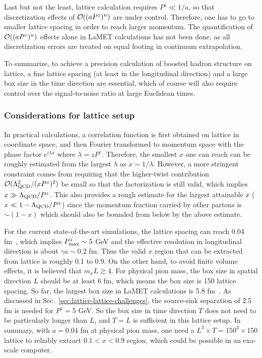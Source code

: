 \documentclass[aps,rmp,reprint,amsmath,amssymb,graphicx,longbibliography]{revtex4-1} %
\begin{document}
Last but not the least, lattice calculation requires $P^z\ll 1/a$, so that discretization effects of ${\cal O}((aP^z)^n)$ are under control. Therefore, one has to go to smaller lattice spacing in order to reach larger momentum. The quantification of ${\cal O}((aP^z)^n)$ effects alone in LaMET calculations has not been done, as all discretization errors are treated on equal footing in continuum extrapolation.

To summarize, to achieve a precision calculation of boosted hadron structure on lattice, a fine lattice spacing (at least in the longitudinal direction) and a large box size in the time direction are essential, which of course will also require control over the signal-to-noise ratio at large Euclidean times.

\subsubsection{Considerations for lattice setup}
\label{sec:lattice-lattice-special}


In practical calculations, a correlation function is first obtained on lattice in coordinate space, and then Fourier transformed to momentum space with the phase factor $e^{i\lambda x}$ where $\lambda=zP^z$.
Therefore, the smallest $x$ one can reach can be roughly estimated from the largest $\lambda$ as $x\sim 1/\lambda$.
%
However, a more stringent constraint comes from requiring that the higher-twist contribution ${\cal O}(\Lambda_{\rm QCD}^2/(xP^z)^2)$ be small so that the factorization is still valid, which implies $x\gg \Lambda_{\rm QCD}/P^z$.
%
This also provides a rough estimate for the largest attainable $x$ ($x\ll 1-\Lambda_{\rm QCD}/P^z$) since the momentum fraction carried by other partons is $\sim (1-x)$ which should also be bounded from below by the above estimate.


For the current state-of-the-art simulations, the lattice spacing can reach 0.04 fm~\cite{Fan:2020nzz,Gao:2020ito}, which implies $P^z_{\rm max}\sim 5$ GeV and the effective resolution in longitudinal direction is about $\gamma a\sim 0.2$ fm.
%
Thus the valid $x$ region that can be extracted from lattice is roughly 0.1 to 0.9.
%
On the other hand, to avoid finite volume effects, it is believed that $m_\pi L\gtrsim 4$.
%
For physical pion mass, the box size in spatial direction $L$ should be at least 6 fm, which means the box size is 150 lattice spacing. So far, the largest box size in LaMET calculations is 5.8 fm~\cite{Lin:2018qky}.
%
As discussed in Sec.~\ref{sec:lattice-lattice-challenges}, the source-sink separation of 2.5 fm is needed for $P^z=5$ GeV.
%
So the box size in time direction $T$ does not need to be particularly longer than $L$, and $T=L$ is sufficient in this lattice setup.
%
In summary, with $a=0.04$ fm at physical pion mass, one need a
$L^3\times T=150^3\times 150$ lattice to reliably extract $0.1<x<0.9$ region, which
could be possible in an exa-scale computer.
\end{document}
